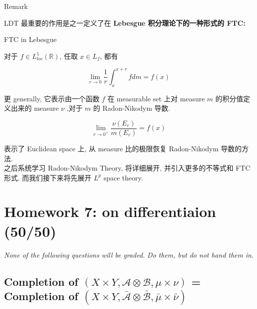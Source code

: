 \documentclass{qlnotes-export}
\begin{document}
\begin{qlremark}{Remark}

LDT 最重要的作用是之一定义了在 \textbf{Lebesgue 积分理论下的一种形式的 FTC:}

\begin{theorem}{FTC in Lebesgue}\label{thm-08-hardy-littlewood-ldt-ftc-in-lebesgue}

对于 \(f \in L_{loc}^{1}({\mathbb{R}})\), 任取 \(x \in L_{f}\), 都有

\[\lim\limits_{r\rightarrow 0}\frac{1}{r}\int_{x}^{x + r}f dm = f(x)\]

\end{theorem}

更 generally, 它表示由一个函数 \(f\) 在 measurable set 上对 measure \(m\) 的积分值定义出来的 measure \(\nu\) ,对于 \(m\) 的 Radon-Nikodym 导数.

\[\lim\limits_{r\rightarrow 0^{+}}\frac{\nu(E_{r})}{m(E_{r})} = f(x)\]

表示了 Euclidean space 上, 从 measure 比的极限恢复 Radon-Nikodym 导数的方法.\\
之后系统学习 Radon-Nikodym Theory, 将详细展开, 并引入更多的不等式和 FTC 形式. 而我们接下来将先展开 \(L^{p}\) space theory.

\end{qlremark}

\chapter{Homework 7: on differentiaion (50/50)}\label{homework-7-on-differentiaion-5050}

\emph{None of the following questions will be graded. Do them, but do not hand them in}.

\section{\texorpdfstring{Completion of \((X \times Y,\mathcal{A} \otimes \mathcal{B},\mu \times \nu)\) = Completion of \((X \times Y,\bar{\mathcal{A}} \otimes \bar{\mathcal{B}},\bar{\mu} \times \bar{\nu})\)}{Completion of (X \textbackslash times Y,\textbackslash mathcal\{A\} \textbackslash otimes \textbackslash mathcal\{B\},\textbackslash mu \textbackslash times \textbackslash nu) = Completion of (X \textbackslash times Y,\textbackslash bar\{\textbackslash mathcal\{A\}\} \textbackslash otimes \textbackslash bar\{\textbackslash mathcal\{B\}\},\textbackslash bar\{\textbackslash mu\} \textbackslash times \textbackslash bar\{\textbackslash nu\})}}\label{completion-of-xtimes-y-mathcalaotimes-mathcalb-mutimes-nu-completion-of-xtimes-y-barmathcalaotimes-barmathcalb-barmutimes-barnu}
\end{document}
